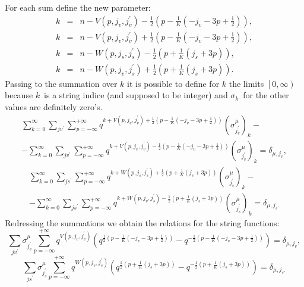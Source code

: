 \documentclass{article}
\begin{document}
For each sum define the new parameter: 
\begin{eqnarray*}
k &=&n-V\left( p,j_{v},j_{v}^{\prime }\right) -\frac{1}{2}\left( p-\frac{1}{K%
}\left( -j_{v}-3p+\frac{1}{2}\right) \right) , \\
k &=&n-V\left( p,j_{v},j_{v}^{\prime }\right) +\frac{1}{2}\left( p-\frac{1}{K%
}\left( -j_{v}-3p+\frac{1}{2}\right) \right) , \\
k &=&n-W\left( p,j_{s},j_{s}^{\prime }\right) -\frac{1}{2}\left( p+\frac{1}{K%
}\left( j_{s}+3p\right) \right) , \\
k &=&n-W\left( p,j_{v},j_{s}^{\prime }\right) +\frac{1}{2}\left( p+\frac{1}{K%
}\left( j_{s}+3p\right) \right) .
\end{eqnarray*}
Passing to the summation over $k$ it is possible to define for $k$ the
limits $\left[ 0,\infty \right) $ because $k$\ is a string indice (and
supposed to be integer) and $\sigma _{k}$\ for the other values are
definitely zero's. 
\begin{multline*}
\sum_{k=0}^{\infty }\sum_{jv^{\prime }}\sum_{p=-\infty }^{+\infty
}q^{k+V\left( p,j_{v},j_{v}^{\prime }\right) +\frac{1}{2}\left( p-\frac{1}{K}%
\left( -j_{v}-3p+\frac{1}{2}\right) \right) }\left( \sigma _{j_{v}^{\prime
}}^{\mu }\right) _{k}- \\
-\sum_{k=0}^{\infty }\sum_{jv^{\prime }}\sum_{p=-\infty }^{+\infty
}q^{k+V\left( p,j_{v},j_{v}^{\prime }\right) -\frac{1}{2}\left( p-\frac{1}{K}%
\left( -j_{v}-3p+\frac{1}{2}\right) \right) }\left( \sigma _{j_{v}^{\prime
}}^{\mu }\right) _{k}=\delta _{\mu ,j_{v}},
\end{multline*}
\begin{multline*}
\sum_{k=0}^{\infty }\sum_{js^{\prime }}\sum_{p=-\infty }^{+\infty
}q^{k+W\left( p,j_{s},j_{s}^{\prime }\right) +\frac{1}{2}\left( p+\frac{1}{K}%
\left( j_{s}+3p\right) \right) }\left( \sigma _{j_{s}^{\prime }}^{\mu
}\right) _{k}- \\
-\sum_{k=0}^{\infty }\sum_{js^{\prime }}\sum_{p=-\infty }^{+\infty
}q^{k+W\left( p,j_{v},j_{s}^{\prime }\right) -\frac{1}{2}\left( p+\frac{1}{K}%
\left( j_{s}+3p\right) \right) }\left( \sigma _{j_{s}^{\prime }}^{\mu
}\right) _{k}=\delta _{\mu ,j_{s}.}
\end{multline*}
Redressing the summations we obtain the relations for the string functions: 
\begin{equation*}
\sum_{jv^{\prime }}\sigma _{j_{v}^{\prime }}^{\mu }\sum_{p=-\infty
}^{+\infty }q^{V\left( p,j_{v},j_{v}^{\prime }\right) }\left( q^{\frac{1}{2}%
\left( p-\frac{1}{K}\left( -j_{v}-3p+\frac{1}{2}\right) \right) }-q^{-\frac{1%
}{2}\left( p-\frac{1}{K}\left( -j_{v}-3p+\frac{1}{2}\right) \right) }\right)
=\delta _{\mu ,j_{v}},
\end{equation*}
\begin{equation*}
\sum_{js^{\prime }}\sigma _{j_{s}^{\prime }}^{\mu }\sum_{p=-\infty
}^{+\infty }q^{W\left( p,j_{s},j_{s}^{\prime }\right) }\left( q^{\frac{1}{2}%
\left( p+\frac{1}{K}\left( j_{s}+3p\right) \right) }-q^{-\frac{1}{2}\left( p+%
\frac{1}{K}\left( j_{s}+3p\right) \right) }\right) =\delta _{\mu ,j_{s}.}
\end{equation*}
\end{document}
